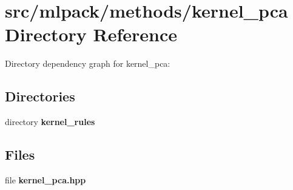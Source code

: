 \section{src/mlpack/methods/kernel\-\_\-pca Directory Reference}
\label{dir_2a0e5e8fa2ea124743177b43353a1313}
Directory dependency graph for kernel\-\_\-pca\-:
\subsection*{Directories}
\begin{DoxyCompactItemize}
\item 
directory {\bf kernel\-\_\-rules}
\end{DoxyCompactItemize}
\subsection*{Files}
\begin{DoxyCompactItemize}
\item 
file {\bf kernel\-\_\-pca.\-hpp}
\end{DoxyCompactItemize}
